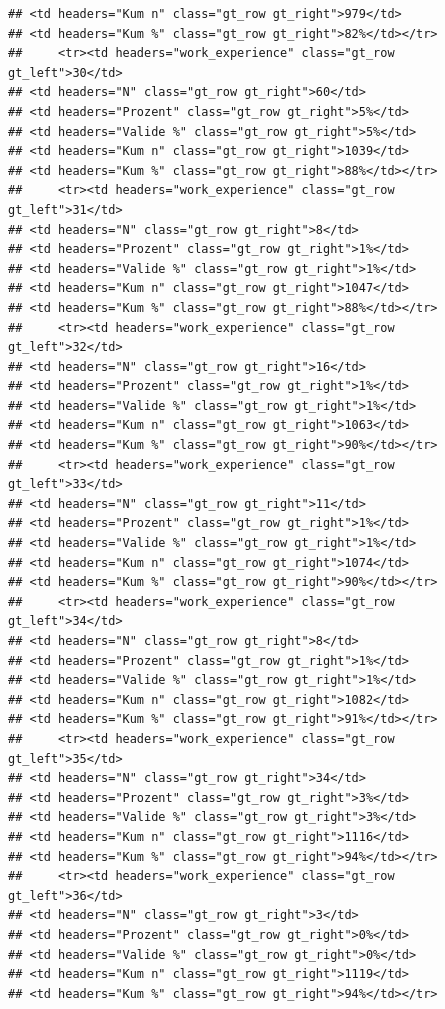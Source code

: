 \documentclass[
  a4paper,
  DIV=11,
  numbers=noendperiod]{scrartcl}
\begin{document}
\begin{verbatim}
## <td headers="Kum n" class="gt_row gt_right">979</td>
## <td headers="Kum %" class="gt_row gt_right">82%</td></tr>
##     <tr><td headers="work_experience" class="gt_row gt_left">30</td>
## <td headers="N" class="gt_row gt_right">60</td>
## <td headers="Prozent" class="gt_row gt_right">5%</td>
## <td headers="Valide %" class="gt_row gt_right">5%</td>
## <td headers="Kum n" class="gt_row gt_right">1039</td>
## <td headers="Kum %" class="gt_row gt_right">88%</td></tr>
##     <tr><td headers="work_experience" class="gt_row gt_left">31</td>
## <td headers="N" class="gt_row gt_right">8</td>
## <td headers="Prozent" class="gt_row gt_right">1%</td>
## <td headers="Valide %" class="gt_row gt_right">1%</td>
## <td headers="Kum n" class="gt_row gt_right">1047</td>
## <td headers="Kum %" class="gt_row gt_right">88%</td></tr>
##     <tr><td headers="work_experience" class="gt_row gt_left">32</td>
## <td headers="N" class="gt_row gt_right">16</td>
## <td headers="Prozent" class="gt_row gt_right">1%</td>
## <td headers="Valide %" class="gt_row gt_right">1%</td>
## <td headers="Kum n" class="gt_row gt_right">1063</td>
## <td headers="Kum %" class="gt_row gt_right">90%</td></tr>
##     <tr><td headers="work_experience" class="gt_row gt_left">33</td>
## <td headers="N" class="gt_row gt_right">11</td>
## <td headers="Prozent" class="gt_row gt_right">1%</td>
## <td headers="Valide %" class="gt_row gt_right">1%</td>
## <td headers="Kum n" class="gt_row gt_right">1074</td>
## <td headers="Kum %" class="gt_row gt_right">90%</td></tr>
##     <tr><td headers="work_experience" class="gt_row gt_left">34</td>
## <td headers="N" class="gt_row gt_right">8</td>
## <td headers="Prozent" class="gt_row gt_right">1%</td>
## <td headers="Valide %" class="gt_row gt_right">1%</td>
## <td headers="Kum n" class="gt_row gt_right">1082</td>
## <td headers="Kum %" class="gt_row gt_right">91%</td></tr>
##     <tr><td headers="work_experience" class="gt_row gt_left">35</td>
## <td headers="N" class="gt_row gt_right">34</td>
## <td headers="Prozent" class="gt_row gt_right">3%</td>
## <td headers="Valide %" class="gt_row gt_right">3%</td>
## <td headers="Kum n" class="gt_row gt_right">1116</td>
## <td headers="Kum %" class="gt_row gt_right">94%</td></tr>
##     <tr><td headers="work_experience" class="gt_row gt_left">36</td>
## <td headers="N" class="gt_row gt_right">3</td>
## <td headers="Prozent" class="gt_row gt_right">0%</td>
## <td headers="Valide %" class="gt_row gt_right">0%</td>
## <td headers="Kum n" class="gt_row gt_right">1119</td>
## <td headers="Kum %" class="gt_row gt_right">94%</td></tr>

\end{verbatim}
\end{document}
